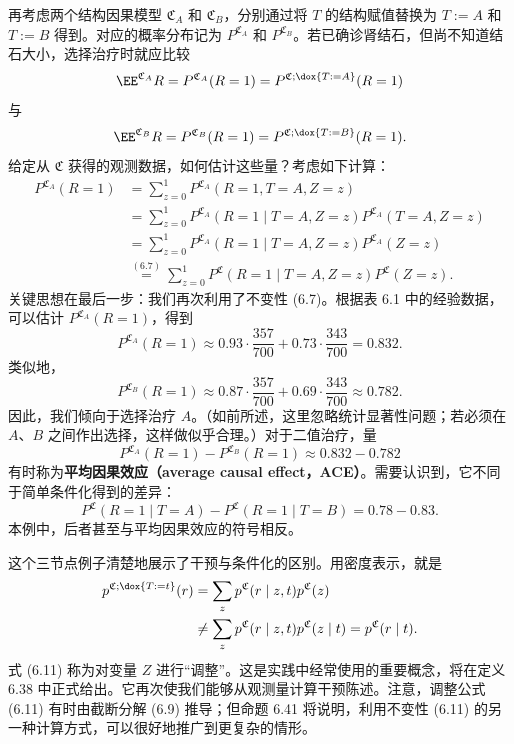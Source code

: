 \begin{example}[肾结石，续]
再考虑两个结构因果模型 $\mathfrak C_A$ 和 $\mathfrak C_B$，分别通过将 $T$ 的结构赋值替换为 $T:=A$ 和 $T:=B$ 得到。对应的概率分布记为 $P^{\mathfrak C_A}$ 和 $P^{\mathfrak C_B}$。若已确诊肾结石，但尚不知道结石大小，选择治疗时就应比较
\[
 \EE^{\mathfrak C_A}R=P^{\mathfrak C_A}(R=1)
 =P^{\mathfrak C;\dox{T:=A}}(R=1)
\]
与
\[
 \EE^{\mathfrak C_B}R=P^{\mathfrak C_B}(R=1)
 =P^{\mathfrak C;\dox{T:=B}}(R=1).
\]
给定从 $\mathfrak C$ 获得的观测数据，如何估计这些量？考虑如下计算：
\begin{equation}
 \begin{aligned}
 P^{\mathfrak C_A}(R=1)
 &=\sum_{z=0}^1P^{\mathfrak C_A}(R=1,T=A,Z=z)\\
 &=\sum_{z=0}^1P^{\mathfrak C_A}(R=1\mid T=A,Z=z)
 P^{\mathfrak C_A}(T=A,Z=z)\\
 &=\sum_{z=0}^1P^{\mathfrak C_A}(R=1\mid T=A,Z=z)
 P^{\mathfrak C_A}(Z=z)\\
 &\overset{(6.7)}{=}\sum_{z=0}^1P^{\mathfrak C}(R=1\mid T=A,Z=z)
 P^{\mathfrak C}(Z=z).
 \end{aligned}
 \tag{6.11}
\end{equation}
关键思想在最后一步：我们再次利用了不变性 (6.7)。根据表 6.1 中的经验数据，可以估计 $P^{\mathfrak C_A}(R=1)$，得到
\[
 P^{\mathfrak C_A}(R=1)\approx0.93\cdot\frac{357}{700}
 +0.73\cdot\frac{343}{700}=0.832.
\]
类似地，
\[
 P^{\mathfrak C_B}(R=1)\approx0.87\cdot\frac{357}{700}
 +0.69\cdot\frac{343}{700}\approx0.782.
\]
因此，我们倾向于选择治疗 $A$。（如前所述，这里忽略统计显著性问题；若必须在 $A$、$B$ 之间作出选择，这样做似乎合理。）对于二值治疗，量
\begin{equation}
 P^{\mathfrak C_A}(R=1)-P^{\mathfrak C_B}(R=1)
 \approx0.832-0.782
 \tag{6.12}
\end{equation}
有时称为\textbf{平均因果效应（average causal effect，ACE）}。需要认识到，它不同于简单条件化得到的差异：
\[
 P^{\mathfrak C}(R=1\mid T=A)-P^{\mathfrak C}(R=1\mid T=B)
 =0.78-0.83.
\]
本例中，后者甚至与平均因果效应的符号相反。
\end{example}

这个三节点例子清楚地展示了干预与条件化的区别。用密度表示，就是
\[
 \begin{aligned}
 p^{\mathfrak C;\dox{T:=t}}(r)
 &=\sum_zp^{\mathfrak C}(r\mid z,t)p^{\mathfrak C}(z)\\
 &\ne\sum_zp^{\mathfrak C}(r\mid z,t)p^{\mathfrak C}(z\mid t)
 =p^{\mathfrak C}(r\mid t).
 \end{aligned}
\]
式 (6.11) 称为对变量 $Z$ 进行“调整”。这是实践中经常使用的重要概念，将在定义 6.38 中正式给出。它再次使我们能够从观测量计算干预陈述。注意，调整公式 (6.11) 有时由截断分解 (6.9) 推导；但命题 6.41 将说明，利用不变性 (6.11) 的另一种计算方式，可以很好地推广到更复杂的情形。

